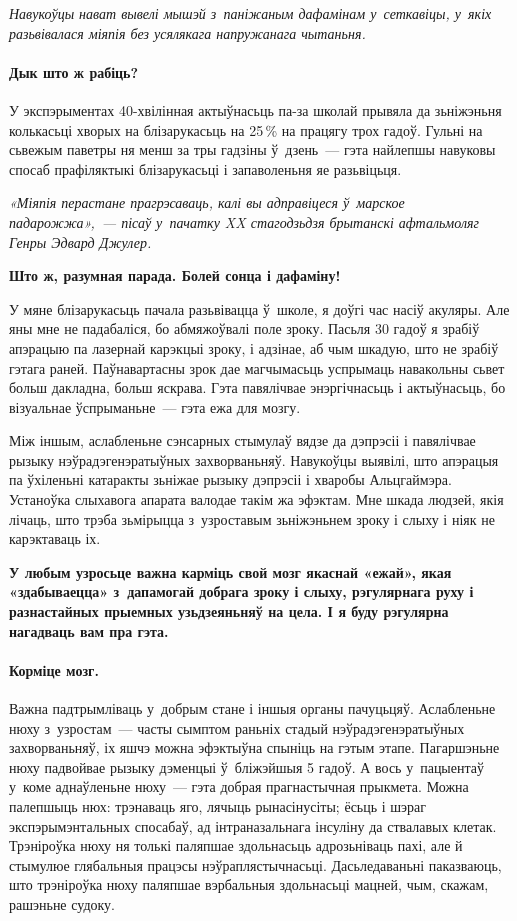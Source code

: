 \emph{Навукоўцы нават вывелі мышэй з~паніжаным дафамінам у~сеткавіцы, у~якіх разьвівалася міяпія без усялякага напружанага чытаньня.}

\paragraph{Дык што ж рабіць?} У экспэрыментах 40-хвілінная актыўнасьць па-за школай прывяла да зьніжэньня колькасьці хворых на блізарукасьць на 25\,\% на працягу трох гадоў. Гульні на сьвежым паветры ня менш за тры гадзіны ў~дзень~--- гэта найлепшы навуковы спосаб прафіляктыкі блізарукасьці і запаволеньня яе разьвіцьця. 

\emph{«Міяпія перастане прагрэсаваць, калі вы адправіцеся ў~марское падарожжа»,~--- пісаў у~пачатку XX стагодзьдзя брытанскі афтальмоляг Генры Эдвард Джулер.}

\textbf{Што ж, разумная парада. Болей сонца і дафаміну!}

У мяне блізарукасьць пачала разьвівацца ў~школе, я доўгі час насіў акуляры. Але яны мне не падабаліся, бо абмяжоўвалі поле зроку. Пасьля 30 гадоў я зрабіў апэрацыю па лазернай карэкцыі зроку, і адзінае, аб чым шкадую, што не зрабіў гэтага раней. Паўнавартасны зрок дае магчымасьць успрымаць навакольны сьвет больш дакладна, больш яскрава. Гэта павялічвае энэргічнасьць і актыўнасьць, бо візуальнае ўспрыманьне~--- гэта ежа для мозгу.

Між іншым, аслабленьне сэнсарных стымулаў вядзе да дэпрэсіі і павялічвае рызыку нэўрадэгенэратыўных захворваньняў. Навукоўцы выявілі, што апэрацыя па ўхіленьні катаракты зьніжае рызыку дэпрэсіі і хваробы Альцгаймэра. Устаноўка слыхавога апарата валодае такім жа эфэктам. Мне шкада людзей, якія лічаць, што трэба зьмірыцца з~узроставым зьніжэньнем зроку і слыху і ніяк не карэктаваць іх. 

\textbf{У любым узросьце важна карміць свой мозг якаснай «ежай», якая «здабываецца» з~дапамогай добрага зроку і слыху, рэгулярнага руху і разнастайных прыемных узьдзеяньняў на цела. І я буду рэгулярна нагадваць вам пра гэта.}

\paragraph{Корміце мозг.} Важна падтрымліваць у~добрым стане і іншыя органы пачуцьцяў. Аслабленьне нюху з~узростам~--- часты сымптом раньніх стадый нэўрадэгенэратыўных захворваньняў, іх яшчэ можна эфэктыўна спыніць на гэтым этапе. Пагаршэньне нюху падвойвае рызыку дэменцыі ў~бліжэйшыя 5 гадоў. А вось у~пацыентаў у~коме аднаўленьне нюху~--- гэта добрая прагнастычная прыкмета. Можна палепшыць нюх: трэнаваць яго, лячыць рынасінусіты; ёсьць і шэраг экспэрымэнтальных спосабаў, ад інтраназальнага інсуліну да ствалавых клетак. Трэніроўка нюху ня толькі паляпшае здольнасьць адрозьніваць пахі, але й стымулюе глябальныя працэсы нэўраплястычнасьці. Дасьледаваньні паказваюць, што трэніроўка нюху паляпшае вэрбальныя здольнасьці мацней, чым, скажам, рашэньне судоку.

